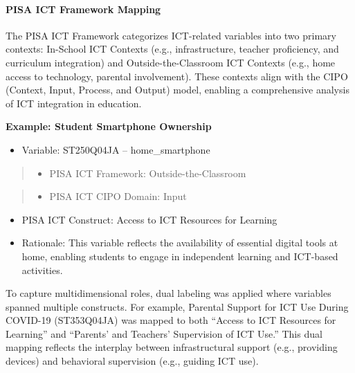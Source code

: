 \documentclass[
]{article}
\providecommand{\tightlist}{%
  \setlength{\itemsep}{0pt}\setlength{\parskip}{0pt}}
\begin{document}
\hypertarget{pisa-ict-framework-mapping}{%
\paragraph{PISA ICT Framework
Mapping}\label{pisa-ict-framework-mapping}}

The PISA ICT Framework categorizes ICT-related variables into two
primary contexts: In-School ICT Contexts (e.g., infrastructure, teacher
proficiency, and curriculum integration) and Outside-the-Classroom ICT
Contexts (e.g., home access to technology, parental involvement). These
contexts align with the CIPO (Context, Input, Process, and Output)
model, enabling a comprehensive analysis of ICT integration in
education.

\textbf{Example: Student Smartphone Ownership}

\begin{itemize}
\tightlist
\item
  Variable: ST250Q04JA -- home\_smartphone
\end{itemize}

\begin{quote}
\begin{itemize}
\tightlist
\item
  PISA ICT Framework: Outside-the-Classroom
\end{itemize}
\end{quote}

\begin{quote}
\begin{itemize}
\tightlist
\item
  PISA ICT CIPO Domain: Input
\end{itemize}
\end{quote}

\begin{itemize}
\item
  PISA ICT Construct: Access to ICT Resources for Learning
\item
  Rationale: This variable reflects the availability of essential
  digital tools at home, enabling students to engage in independent
  learning and ICT-based activities.
\end{itemize}

To capture multidimensional roles, dual labeling was applied where
variables spanned multiple constructs. For example, Parental Support for
ICT Use During COVID-19 (ST353Q04JA) was mapped to both ``Access to ICT
Resources for Learning'' and ``Parents' and Teachers' Supervision of ICT
Use.'' This dual mapping reflects the interplay between infrastructural
support (e.g., providing devices) and behavioral supervision (e.g.,
guiding ICT use).
\end{document}
